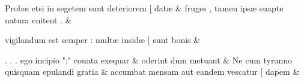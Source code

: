 \documentclass[12pt,onecolumn,twoside,a4paper]{memoir}
\begin{document}
\begin{pairs}
\begin{Leftside}
                              Probæ
                              etsi
                              in
                              segetem
                              sunt
                              deteriorem
                              [
                              datæ & 
                     fruges
                              ,
                              tamen
                              ipsæ
                              suapte
                              natura
                              enitent
                              . \&
                         \stanza {}
                     
                              vigilandum
                              est
                              semper
                              :
                              multæ
                              insidæ
                              [
                              sunt
                              bonis \&
                         \stanza {}
                     
                              .
                              .
                              .
                              ego
                              incipio
                              ";"
                              conata
                              exequar \&
                         \stanza {}
                     oderint
                              dum
                              metuant \&
                         \stanza {}Ne
                              cum
                              tyranno
                              quisquam
                              epulandi
                              gratia & 
                     accumbat
                              mensam
                              aut
                              eandem
                              vescatur
                              [
                              dapem \&
                         \stanza {}
                     

\end{Leftside}
\end{pairs}
\end{document}
